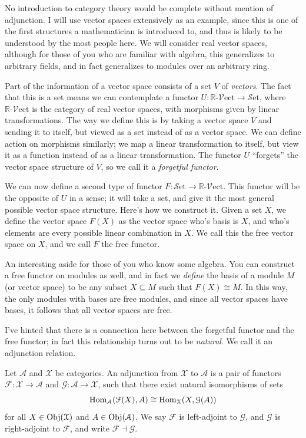 \documentclass[11pt, letterpaper]{article}
\newcommand{\Set}{\mathcal{S}\mathrm{et}}
\renewcommand{\Vect}[1]{#1\text{-}\mathcal{V}\mathrm{ect}}
\begin{document}
No introduction to category theory would be complete without mention of adjunction. I will use vector spaces extensively as an example, since this is one of the first structures a mathematician is introduced to, and thus is likely to be understood by the most people here. We will consider real vector spaces, although for those of you who are familiar with algebra, this generalizes to arbitrary fields, and in fact generalizes to modules over an arbitrary ring.

Part of the information of a vector space consists of a set $V$ of \emph{vectors}. The fact that this is a set means we can contemplate a functor $U :\Vect{\mathbb{R}} \to \Set $, where $\Vect{\mathbb{R} } $ is the category of real vector spaces, with morphisms given by linear transformations. The way we define this is by taking a vector space $V$ and sending it to itself, but viewed as a set instead of as a vector space. We can define action on morphisms similarly; we map a linear transformation to itself, but view it as a function instead of as a linear transformation. The functor $U $ ``forgets'' the vector space structure of $V$, so we call it a \emph{forgetful functor}.

We can now define a second type of functor $F : \Set  \to \Vect{\mathbb{R} } $. This functor will be the opposite of $U$ in a sense; it will take a set, and give it the most general possible vector space structure. Here's how we construct it. Given a set $X$, we define the vector space $F(X)$ as the vector space who's basis is $X$,  and who's elements are every possible linear combination in $X$. We call this the free vector space on $X$, and we call $F$ the free functor.

An interesting aside for those of you who know some algebra. You can construct a free functor on modules as well, and in fact we \emph{define} the basis of a module $M$ (or vector space) to be any subset $X\subseteq M$ such that $F(X)\cong M$. In this way, the only modules with bases are free modules, and since all vector spaces have bases, it follows that all vector spaces are free.

I've hinted that there is a connection here between the forgetful functor and the free functor; in fact this relationship turns out to be \emph{natural}. We call it an adjunction relation.

\begin{definition}[Adjunction]\label{dfn:12}
	Let $\mathcal{A} $ and $\mathcal{X} $ be categories. An adjunction from $\mathcal{X} $ to $\mathcal{A} $ is a pair of functors $\mathcal{F} : \mathcal{X}  \to \mathcal{A} $ and $\mathcal{G} : \mathcal{A}  \to \mathcal{X} $, such that there exist natural isomorphisms of sets
	\[
		\operatorname{Hom}_{\mathcal{A} }(\mathcal{F} (X), A) \cong \operatorname{Hom}_{\mathcal{X} }(X, \mathcal{G} (A)) 
	\]
	for all $X\in \operatorname{Obj}(\mathcal{X} ) $ and $A\in \operatorname{Obj}(\mathcal{A} ) $. We say $\mathcal{F} $ is left-adjoint to $\mathcal{G} $, and $\mathcal{G} $ is right-adjoint to $\mathcal{F} $, and write $\mathcal{F} \dashv \mathcal{G} $.
\end{definition}
\end{document}
